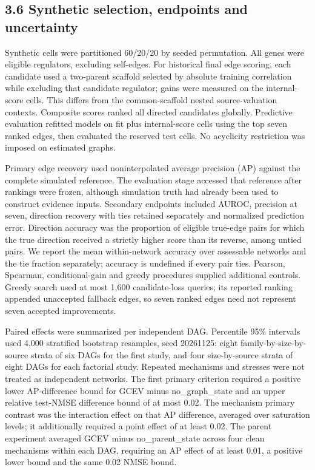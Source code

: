 \documentclass[
  11pt,
]{article}
\begin{document}
\subsection{3.6 Synthetic selection, endpoints and
uncertainty}\label{synthetic-selection-endpoints-and-uncertainty}

Synthetic cells were partitioned 60/20/20 by seeded permutation. All
genes were eligible regulators, excluding self-edges. For historical
final edge scoring, each candidate used a two-parent scaffold selected
by absolute training correlation while excluding that candidate
regulator; gains were measured on the internal-score cells. This differs
from the common-scaffold nested source-valuation contexts. Composite
scores ranked all directed candidates globally. Predictive evaluation
refitted models on fit plus internal-score cells using the top seven
ranked edges, then evaluated the reserved test cells. No acyclicity
restriction was imposed on estimated graphs.

Primary edge recovery used noninterpolated average precision (AP)
against the complete simulated reference. The evaluation stage accessed
that reference after rankings were frozen, although simulation truth had
already been used to construct evidence inputs. Secondary endpoints
included AUROC, precision at seven, direction recovery with ties
retained separately and normalized prediction error. Direction accuracy
was the proportion of eligible true-edge pairs for which the true
direction received a strictly higher score than its reverse, among
untied pairs. We report the mean within-network accuracy over assessable
networks and the tie fraction separately; accuracy is undefined if every
pair ties. Pearson, Spearman, conditional-gain and greedy procedures
supplied additional controls. Greedy search used at most 1,600
candidate-loss queries; its reported ranking appended unaccepted
fallback edges, so seven ranked edges need not represent seven accepted
improvements.

Paired effects were summarized per independent DAG. Percentile 95\%
intervals used 4,000 stratified bootstrap resamples, seed 20261125:
eight family-by-size-by-source strata of six DAGs for the first study,
and four size-by-source strata of eight DAGs for each factorial study.
Repeated mechanisms and stresses were not treated as independent
networks. The first primary criterion required a positive lower
AP-difference bound for GCEV minus no\_graph\_state and an upper
relative test-NMSE difference bound of at most 0.02. The mechanism
primary contrast was the interaction effect on that AP difference,
averaged over saturation levels; it additionally required a point effect
of at least 0.02. The parent experiment averaged GCEV minus
no\_parent\_state across four clean mechanisms within each DAG,
requiring an AP effect of at least 0.01, a positive lower bound and the
same 0.02 NMSE bound.
\end{document}
